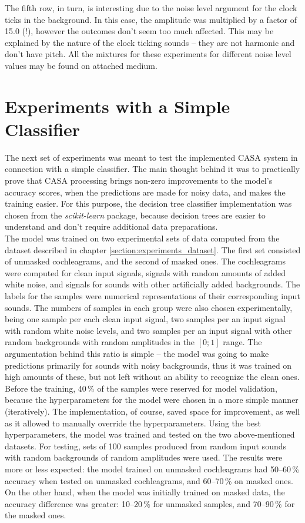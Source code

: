 The fifth row, in turn, is interesting due to the noise level argument for the clock ticks in the background. In this case, the amplitude was multiplied by a factor of 15.0 (!), however the outcomes don't seem too much affected. This may be explained by the nature of the clock ticking sounds -- they are not harmonic and don't have pitch. All the mixtures for these experiments for different noise level values may be found on attached medium.

\section{Experiments with a Simple Classifier}

The next set of experiments was meant to test the implemented CASA system in connection with a simple classifier. The main thought behind it was to practically prove that CASA processing brings non-zero improvements to the model's accuracy scores, when the predictions are made for noisy data, and makes the training easier. For this purpose, the decision tree classifier implementation was chosen from the \textit{scikit-learn} \cite{scikit-learn} package, because decision trees are easier to understand and don't require additional data preparations.\\

The model was trained on two experimental sets of data computed from the dataset described in chapter \ref{section:experiments_dataset}. The first set consisted of unmasked cochleagrams, and the second of masked ones. The cochleagrams were computed for clean input signals, signals with random amounts of added white noise, and signals for sounds with other artificially added backgrounds. The labels for the samples were numerical representations of their corresponding input sounds. The numbers of samples in each group were also chosen experimentally, being one sample per each clean input signal, two samples per an input signal with random white noise levels, and two samples per an input signal with other random backgrounds with random amplitudes in the $[0; 1]$ range. The argumentation behind this ratio is simple -- the model was going to make predictions primarily for sounds with noisy backgrounds, thus it was trained on high amounts of these, but not left without an ability to recognize the clean ones.\\

Before the training, 40\,\% of the samples were reserved for model validation, because the hyperparameters for the model were chosen in a more simple manner (iteratively). The implementation, of course, saved space for improvement, as well as it allowed to manually override the hyperparameters. Using the best hyperparameters, the model was trained and tested on the two above-mentioned datasets. For testing, sets of 100 samples produced from random input sounds with random backgrounds of random amplitudes were used. The results were more or less expected: the model trained on unmasked cochleagrams had 50--60\,\% accuracy when tested on unmasked cochleagrams, and 60--70\,\% on masked ones. On the other hand, when the model was initially trained on masked data, the accuracy difference was greater: 10--20\,\% for unmasked samples, and 70--90\,\% for the masked ones.

